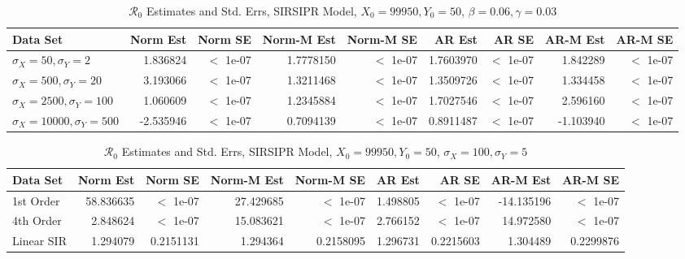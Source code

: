 \documentclass[12pt]{article}
\newcommand{\rr}{\ensuremath{\mathcal{R}_0}}
\begin{document}
\begin{table}[H]
	
	\caption{\label{tab:}$\rr$ Estimates and Std. Errs, SIRSIPR Model,
		$X_0 = 99950, Y_0 = 50$, $\beta = 0.06, \gamma = 0.03$}
	\centering
	\begin{footnotesize}
		\begin{tabular}[t]{l|r|r|r|r|r|r|r|r}
			\hline
			Data Set & Norm Est & Norm SE & Norm-M Est & Norm-M SE & AR Est & AR SE & AR-M Est & AR-M SE\\
			\hline
			$\sigma_X = 50, \sigma_Y = 2$ & 1.836824 & $<$ 1e-07 & 1.7778150 & $<$ 1e-07 & 1.7603970 & $<$ 1e-07 & 1.842289 & $<$ 1e-07 \\
			\hline
			$\sigma_X = 500, \sigma_Y = 20$ & 3.193066 & $<$ 1e-07 & 1.3211468 & $<$ 1e-07 & 1.3509726 & $<$ 1e-07 & 1.334458 & $<$ 1e-07 \\
			\hline
			$\sigma_X = 2500, \sigma_Y = 100$ & 1.060609 & $<$ 1e-07 & 1.2345884 & $<$ 1e-07 & 1.7027546 & $<$ 1e-07 & 2.596160 & $<$ 1e-07 \\
			\hline
			$\sigma_X = 10000, \sigma_Y = 500$ & -2.535946 & $<$ 1e-07 & 0.7094139 & $<$ 1e-07 & 0.8911487 & $<$ 1e-07 & -1.103940 & $<$ 1e-07 \\
			\hline
		\end{tabular}
	\end{footnotesize}
\end{table}

\begin{table}[H]
	
	\caption{\label{tab:}$\rr$ Estimates and Std. Errs, SIRSIPR Model,
		$X_0 = 99950, Y_0 = 50$, $\sigma_X = 100, \sigma_Y = 5$}
	\centering
	\begin{footnotesize}
		\begin{tabular}[t]{l|r|r|r|r|r|r|r|r}
			\hline
			Data Set & Norm Est & Norm SE & Norm-M Est & Norm-M SE & AR Est & AR SE & AR-M Est & AR-M SE\\
			\hline
			1st Order & 58.836635 & $<$ 1e-07 & 27.429685 & $<$ 1e-07 & 1.498805 & $<$ 1e-07 & -14.135196 & $<$ 1e-07 \\
			\hline
			4th Order & 2.848624 & $<$ 1e-07 & 15.083621 & $<$ 1e-07 & 2.766152 & $<$ 1e-07 & 14.972580 & $<$ 1e-07 \\
			\hline
			Linear SIR & 1.294079 & 0.2151131 & 1.294364 & 0.2158095 & 1.296731 & 0.2215603 & 1.304489 & 0.2299876\\
			\hline
		\end{tabular}
	\end{footnotesize}
\end{table}
\end{document}
